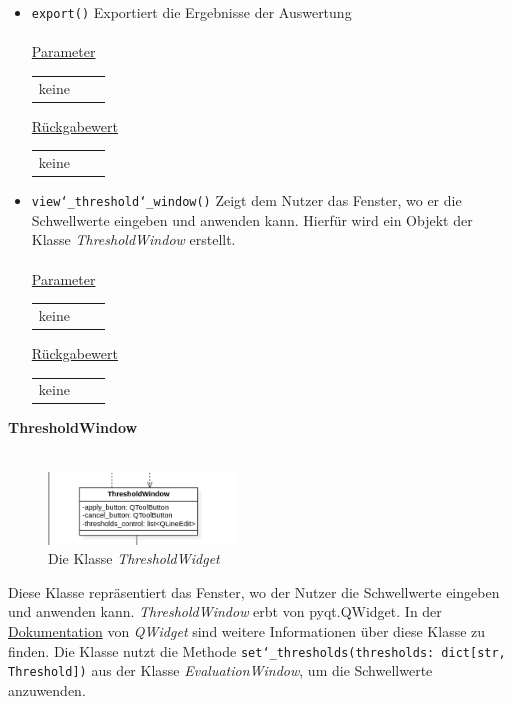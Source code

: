 \documentclass{article}
\begin{document}
\begin{itemize}
\item \texttt{export()} \newline Exportiert die Ergebnisse der Auswertung 
\\\\
\underline{{Parameter}} 
\begin{tabular}{lll}
 keine
\end{tabular}

\underline{{Rückgabewert}}
\begin{tabular}{lll}
keine
\end{tabular}

\item \texttt{view\char`_threshold\char`_window()} \newline Zeigt dem Nutzer das Fenster, wo er die Schwellwerte eingeben und anwenden kann. Hierfür wird ein Objekt der Klasse \textit{ThresholdWindow} erstellt.
\\\\
\underline{{Parameter}} 
\begin{tabular}{lll}
keine
\end{tabular}

\underline{{Rückgabewert}}
\begin{tabular}{lll}
keine
\end{tabular}
\end{itemize}

\newpage
\textbf{\large{ThresholdWindow}}\\\\
\begin{figure}[H]%
    \centering
    \includegraphics[width=5cm]{entwurf/Entwurf_dokument/img/Alissa/ThresholdWindow.png}
    \caption{Die Klasse \textit{ThresholdWidget}}
\end{figure}
Diese Klasse repräsentiert das Fenster, wo der Nutzer die Schwellwerte eingeben und anwenden kann. \textit{ThresholdWindow} erbt von pyqt.QWidget. In der \href{https://doc.qt.io/qt-6/qwidget.html}{Dokumentation} von \textit{QWidget} sind weitere Informationen über diese Klasse zu finden. Die Klasse nutzt die Methode \texttt{set\char`_thresholds(thresholds: dict[str, Threshold])} aus der Klasse \textit{EvaluationWindow}, um die Schwellwerte anzuwenden.
\newline \newline
\end{document}
